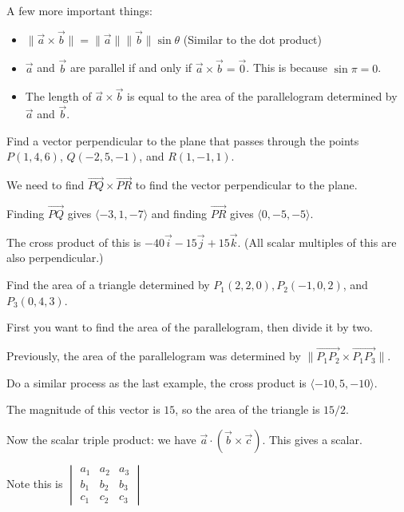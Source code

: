 \documentclass[../calc3.tex]{subfiles}
\begin{document}
A few more important things:
\begin{itemize}
    \item $\|\vec{a}\times \vec{b}\|=\|\vec{a}\|\|\vec{b}\|\sin\theta$ (Similar to the dot product)
    \item $\vec{a}$ and $\vec{b}$ are parallel if and only if $\vec{a}\times \vec{b}=\vec{0}$. This is because $\sin\pi = 0$.
    \item The length of $\vec{a}\times \vec{b}$ is equal to the area of the parallelogram determined by $\vec{a}$ and $\vec{b}$.
\end{itemize}

\begin{example}
    Find a vector perpendicular to the plane that passes through the points $P(1,4,6)$, $Q(-2,5,-1)$, and $R(1,-1,1)$.

    We need to find $\overrightarrow{PQ}\times \overrightarrow{PR}$ to find the vector perpendicular to the plane.

    Finding $\overrightarrow{PQ}$ gives $\langle -3,1,-7\rangle$ and finding $\overrightarrow{PR}$ gives $\langle 0,-5,-5\rangle$.

    The cross product of this is $-40\vec{i}-15\vec{j}+15\vec{k}$. (All scalar multiples of this are also perpendicular.)
\end{example}

\begin{example}
    Find the area of a triangle determined by $P_1(2,2,0), P_2(-1,0,2)$, and $P_3(0,4,3)$.

    First you want to find the area of the parallelogram, then divide it by two.

    Previously, the area of the parallelogram was determined by $\|\overrightarrow{P_1P_2}\times \overrightarrow{P_1P_3}\|$.

    Do a similar process as the last example, the cross product is $\langle -10,5,-10\rangle$.

    The magnitude of this vector is $15$, so the area of the triangle is $15/2$.
\end{example}

Now the scalar triple product: we have $\vec{a}\cdot (\vec{b}\times \vec{c})$. This gives a scalar.

Note this is $\begin{vmatrix}
    a_1 & a_2 & a_3\\
    b_1 & b_2 & b_3\\
    c_1 & c_2 & c_3
\end{vmatrix}$
\end{document}
